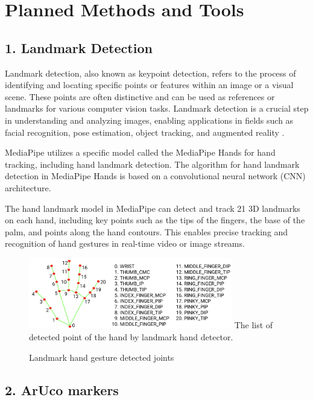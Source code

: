 \documentclass[journal]{IEEEtran}
\begin{document}
\section{Planned Methods and Tools}


\subsection*{1. Landmark Detection}
Landmark detection, also known as keypoint detection, refers to the process of identifying and locating specific points or 
features within an image or a visual scene. These points are often distinctive and can be used as references or landmarks 
for various computer vision tasks. Landmark detection \cite{handsegmentation2023} is a crucial step in understanding and analyzing images, enabling applications 
in fields such as facial recognition, pose estimation, object tracking, and augmented reality \cite{lin2021ego2hands}.

MediaPipe utilizes a specific model called the MediaPipe Hands for hand tracking, including hand landmark detection. 
The algorithm for hand landmark detection in MediaPipe Hands is based on a convolutional neural network (CNN) architecture.

The hand landmark model in MediaPipe can detect and track 21 3D landmarks on each hand, including key points such as the tips 
of the fingers, the base of the palm, and points along the hand contours. This enables precise tracking and recognition of hand 
gestures in real-time video or image streams.

\begin{figure}[!t]
  \centering
  \includegraphics[width=3.5in]{photo/hand-landmarks.png}
  The list of detected point of the hand by landmark hand detector.
  \caption{Landmark hand gesture detected joints}
  \label{fig_sim}
\end{figure}

\subsection*{2. ArUco markers}
\end{document}
